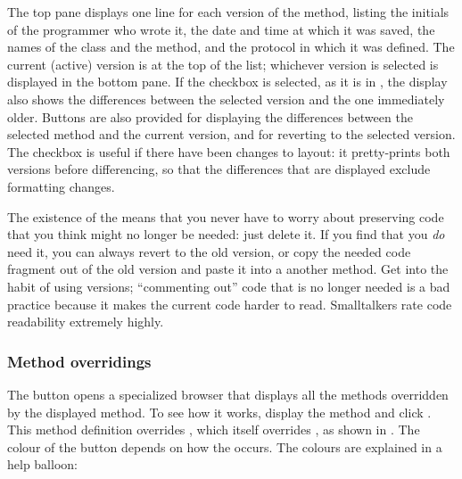 \documentclass[a4paper,10pt,twoside]{book}
\begin{document}
The top pane displays one line for each version of the method, listing the initials of the programmer who wrote it, the date and time at which it was saved, the names of the class and the method, and the protocol in which it was defined.  The current (active) version is at the top of the list;  whichever version is selected is displayed in the bottom pane.  If the  checkbox is selected, as it is in , the display also shows the differences between the selected version and the one immediately older.  Buttons are also provided for displaying the differences between the selected method and the current version, and for reverting to the selected version.   The  checkbox is useful if there have been changes to layout: it pretty-prints both versions before differencing, so that the differences that are displayed exclude formatting changes. 

The existence of the  means that you never have to worry about preserving code that you think might no longer be needed: just delete it.  If you find that you \emph{do} need it, you can always revert to the old version, or copy the needed code fragment out of the old version and paste it into a another method.
Get into the habit of using versions;  ``commenting out'' code that is no longer needed is a bad practice because it makes the current code harder to read.
Smalltalkers rate code readability extremely highly.


\subsubsection{Method overridings}
\label{sec:overriding}

The  button opens a specialized browser that displays all the methods overridden by the displayed method. 
To see how it works, display the  method and click . This method definition overrides \mbox{,} which itself overrides , as shown in . The colour of the  button depends on how the  occurs.  The colours are explained in a help balloon:
\end{document}
